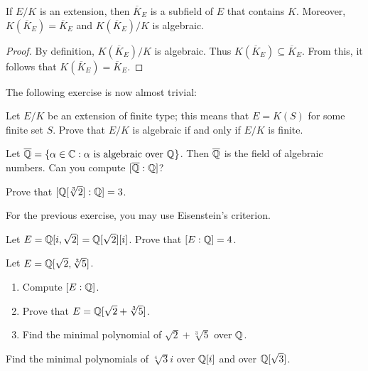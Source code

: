 \begin{corollary}
	If $E/K$ is  an extension, then $\overline{K}_E$ 
	is a subfield of $E$ that contains $K$. Moreover, 
	$K(\overline{K}_E)=\overline{K}_E$ and 
        $K(\overline{K}_E)/K$ is algebraic. 
\end{corollary}	

\begin{proof}
    By definition, $K(\overline{K}_E)/K$ is algebraic. 
    Thus $K(\overline{K}_E)\subseteq\overline{K}_E$. From this, it follows that
    $K(\overline{K}_E)=\overline{K}_E$. 
\end{proof}

The following exercise is now almost trivial:

\begin{exercise}
\label{xca:finite type}
    Let $E/K$ be an extension of finite type; this means 
    that  
    $E=K(S)$ for some finite
    set $S$.  
    Prove that $E/K$ is algebraic if and only if $E/K$ 
    is finite. 
\end{exercise}

Let $\overline{\mathbb{Q}}=\{\alpha\in\mathbb{C}:\alpha\text{ is algebraic over }\mathbb{Q}\}$. 
Then $\overline{\mathbb{Q}}$ is the field of algebraic numbers. 
Can you compute $[\overline{\mathbb{Q}}:\mathbb{Q}]$?

\begin{exercise}
\label{xca:degree of sqrt[3]2}
    Prove that $[\mathbb{Q}[\sqrt[3]{2}]:\mathbb{Q}]=3$. 
\end{exercise}

For the previous exercise, you may use Eisenstein's criterion. 

\begin{exercise}
\label{xca:Q(i,sqrt2)}
    Let $E=\mathbb{Q}[i,\sqrt{2}]=\mathbb{Q}[\sqrt{2}][i]$. Prove that $[E:\mathbb{Q}]=4$.  
\end{exercise}

\begin{exercise}
\label{xca:Q(sqrt2,sqrt[3]5)}
    Let $E=\mathbb{Q}[\sqrt{2},\sqrt[3]{5}]$. 
    \begin{enumerate}
        \item Compute $[E:\mathbb{Q}]$.
        \item Prove that $E=\mathbb{Q}[\sqrt{2}+\sqrt[3]{5}]$.
        \item Find the minimal polynomial of $\sqrt{2}+\sqrt[3]{5}$ over $\mathbb{Q}$. 
    \end{enumerate}
\end{exercise}

\begin{exercise}
    Find the minimal polynomials of $\sqrt[4]{3}i$ over $\mathbb{Q}[i]$ and over $\mathbb{Q}[\sqrt{3}]$. 
\end{exercise}

